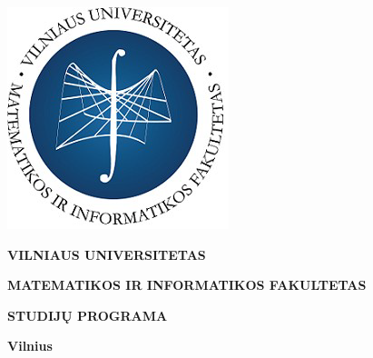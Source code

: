 \begin{titlepage}
\vskip 20pt
\begin{center}
\includegraphics[scale=0.55]{images/MIF.png}
\end{center}

\makeatletter

\vskip 20pt
\centerline{\bf \large \textbf{VILNIAUS UNIVERSITETAS}}
\vskip 10pt
\centerline{\large \textbf{MATEMATIKOS IR INFORMATIKOS FAKULTETAS}}
\vskip 10pt
\centerline{\large \textbf{\MakeUppercase{\@studijuprograma \space studijų programa}}}

\vskip 80pt
\centerline{\Large \@darbotipas}
\vskip 20pt
\begin{center}
    {\bf \LARGE \@darbopavadinimas}
\end{center}
\begin{center}
    {\bf \Large \@darbopavadinimasantras}
\end{center}
\vskip 80pt

\vskip 20pt



\vskip 110pt

\centerline{\large \textbf{Vilnius}}
\centerline{\large \textbf{\the\year{}}}

\makeatother

\newpage
\end{titlepage}
\setcounter{page}{2}
